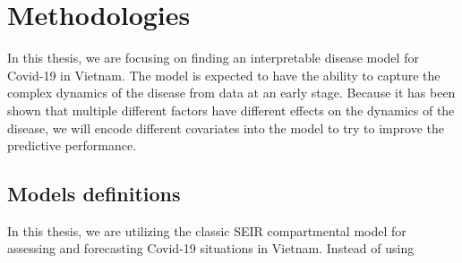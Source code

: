 \chapter{Methodologies}
\label{chap:methodologies}

In this thesis, we are focusing on finding an interpretable disease model for Covid-19 in Vietnam.
The model is expected to have the ability to capture the complex dynamics of the disease from data at an early stage.
Because it has been shown that multiple different factors have different effects on the dynamics of the disease, we will encode different covariates into the model to try to improve the predictive performance.


\section{Models definitions}

In this thesis, we are utilizing the classic \gls{SEIR} compartmental model for assessing and forecasting Covid-19 situations in Vietnam.
Instead of using
